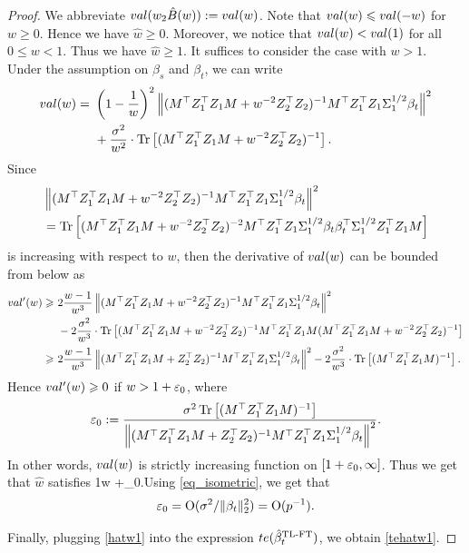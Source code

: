 \begin{proof}
We abbreviate $val(w_2\hat{B}(w)):=val(w)$. Note that $val(w)\leqslant val(-w)$ for $w\ge 0$. Hence we have $\hat w\ge 0$. Moreover, we notice that $val (w) < val (1)$ for all $0\le w < 1$. Thus we have $\hat w\ge 1$. It suffices to consider the case with $w> 1$. Under the assumption on $\beta_s$ and $\beta_t$, we can write
\begin{align}
	val(w) =&~  \left( 1-\frac1w\right)^2 \left\|( M^\top Z_1^{\top}Z_1 M + w^{-2}Z_2^{\top}Z_2)^{-1} M^\top Z_1^{\top} Z_1 \Sigma_1^{1/2}\beta_t \right\|^2 \nonumber \\
			&~ + \frac{\sigma^2}{w^2} \cdot \operatorname{Tr}\left[( M^\top Z_1^{\top}Z_1 M + w^{-2}Z_2^{\top}Z_2)^{-1} \right]. \nonumber
\end{align}
Since
\begin{align*}
&\left\|( M^\top Z_1^{\top}Z_1 M + w^{-2}Z_2^{\top}Z_2)^{-1} M^\top Z_1^{\top} Z_1 \Sigma_1^{1/2}\beta_t \right\|^2 \\
&= \operatorname{Tr} \left[ ( M^\top Z_1^{\top}Z_1 M + w^{-2}Z_2^{\top}Z_2)^{-2}M^\top Z_1^{\top} Z_1 \Sigma_1^{1/2}\beta_t\beta_t^\top \Sigma_1^{1/2}Z_1^{\top} Z_1  M\right]
\end{align*}
is increasing with respect to $w$, then the derivative of $val(w)$ can be bounded from below as
\begin{align*}
val'(w) \geqslant &~ 2\frac{w-1}{w^3} \left\|( M^\top Z_1^{\top}Z_1 M + w^{-2}Z_2^{\top}Z_2)^{-1} M^\top Z_1^{\top} Z_1 \Sigma_1^{1/2}\beta_t \right\|^2   \\
			&~ - 2 \frac{\sigma^2}{w^3} \cdot \operatorname{Tr}\left[(M^\top Z_1^{\top}Z_1 M +w^{-2}  Z_2^{\top}Z_2)^{-1} M^\top Z_1^{\top}Z_1 M (M^\top Z_1^{\top}Z_1 M + w^{-2} Z_2^{\top}Z_2)^{-1}\right] \\
\geqslant &~ 2\frac{w-1}{w^3} \left\|( M^\top Z_1^{\top}Z_1 M +  Z_2^{\top}Z_2)^{-1} M^\top Z_1^{\top} Z_1 \Sigma_1^{1/2}\beta_t \right\|^2   - 2 \frac{\sigma^2}{w^3} \cdot \operatorname{Tr}\left[(M^\top Z_1^{\top}Z_1 M)^{-1}\right].
\end{align*}
Hence $val'(w)\geqslant 0$ if $w>1+ {\varepsilon}_0$, where
$${\varepsilon}_0:= \frac{\sigma^2  \operatorname{Tr}\left[(M^\top Z_1^{\top}Z_1 M)^{-1}\right] }{\left\|( M^\top Z_1^{\top}Z_1 M + Z_2^{\top}Z_2)^{-1} M^\top Z_1^{\top} Z_1 \Sigma_1^{1/2}\beta_t \right\|^2}.$$
In other words, $val(w)$ is strictly increasing function on $[1+{\varepsilon}_0,\infty]$. Thus we get that $\hat w$ satisfies 
\be\label{hatw1}1\le w +\e_0.\ee Using \eqref{eq_isometric}, we get that
$${\varepsilon}_0=\operatorname{O}(\sigma^2/\|\beta_t\|_2^2)=\operatorname{O}(p^{-1}).$$

Finally, plugging \eqref{hatw1} into the expression $te(\hat{\beta}^{\text{TL-FT}}_{t}) $, we obtain \eqref{tehatw1}.
\end{proof}



